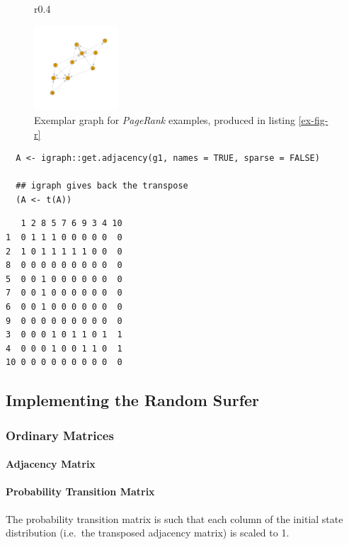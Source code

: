 \documentclass[11pt]{article}
\begin{document}
\begin{figure}{r}{0.4\textwidth}
\begin{center}
\includegraphics[width=0.28\textwidth]{media/example-graph-power-walk.png}
\end{center}
\caption{\label{example-rs-graph}Exemplar graph for \emph{PageRank} examples, produced in listing \ref{ex-fig-r}}
\end{figure}


\begin{listing}[htbp]
\begin{verbatim}
  A <- igraph::get.adjacency(g1, names = TRUE, sparse = FALSE)

  ## igraph gives back the transpose
  (A <- t(A))
\end{verbatim}
\caption{\label{adj-mat-random-surf}Return the Adjacency Matrix corresponding to figure \ref{example-rs-graph}}
\end{listing}

\begin{verbatim}
   1 2 8 5 7 6 9 3 4 10
1  0 1 1 1 0 0 0 0 0  0
2  1 0 1 1 1 1 1 0 0  0
8  0 0 0 0 0 0 0 0 0  0
5  0 0 1 0 0 0 0 0 0  0
7  0 0 1 0 0 0 0 0 0  0
6  0 0 1 0 0 0 0 0 0  0
9  0 0 0 0 0 0 0 0 0  0
3  0 0 0 1 0 1 1 0 1  1
4  0 0 0 1 0 0 1 1 0  1
10 0 0 0 0 0 0 0 0 0  0
\end{verbatim}


\subsection{Implementing the Random Surfer}
\label{sec:orgb756c9c}
\subsubsection{Ordinary Matrices}
\label{implementing-page-rank-methods}
\paragraph{Adjacency Matrix}
\label{adjacency-matrix}

\paragraph{Probability Transition Matrix}
\label{probability-transition-matrix}
The probability transition matrix is such that each column of the
initial state distribution (i.e. the transposed adjacency matrix) is
scaled to 1.
\end{document}
